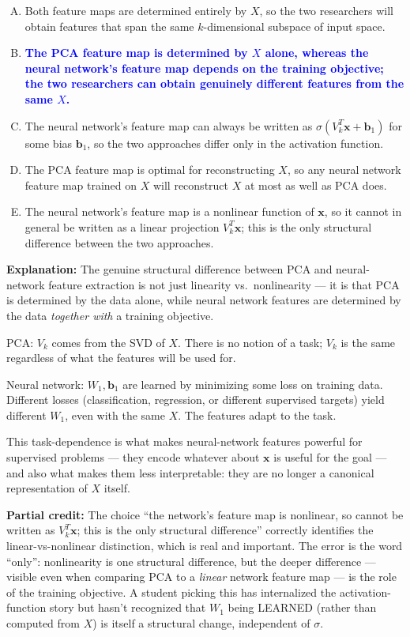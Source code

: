 \documentclass[12pt]{amsart}
\begin{document}
\begin{enumerate}[(A)]
\item Both feature maps are determined entirely by $X$, so the two researchers
will obtain features that span the same $k$-dimensional subspace of input space.
\item \textcolor{blue}{\textbf{The PCA feature map is determined by $X$ alone, whereas the neural network's feature map depends on the training objective; the two researchers can obtain genuinely different features from the same $X$.}}
\item The neural network's feature map can always be written as
$\sigma(V_k^T \mathbf{x} + \mathbf{b}_1)$ for some bias $\mathbf{b}_1$, so the
two approaches differ only in the activation function.
\item The PCA feature map is optimal for reconstructing $X$, so any neural
network feature map trained on $X$ will reconstruct $X$ at most as well as
PCA does.
\item The neural network's feature map is a nonlinear function of $\mathbf{x}$,
so it cannot in general be written as a linear projection $V_k^T \mathbf{x}$;
this is the only structural difference between the two approaches.
\end{enumerate}

\textbf{Explanation:}
The genuine structural difference between PCA and neural-network feature
extraction is not just linearity vs.\ nonlinearity --- it is that PCA is
determined by the data alone, while neural network features are determined
by the data \emph{together with} a training objective.

PCA: $V_k$ comes from the SVD of $X$. There is no notion of a task; $V_k$ is
the same regardless of what the features will be used for.

Neural network: $W_1, \mathbf{b}_1$ are learned by minimizing some loss on
training data. Different losses (classification, regression, or different
supervised targets) yield different $W_1$, even with the same $X$.
The features adapt to the task.

This task-dependence is what makes neural-network features powerful for
supervised problems --- they encode whatever about $\mathbf{x}$ is useful for
the goal --- and also what makes them less interpretable: they are no longer
a canonical representation of $X$ itself.

\textbf{Partial credit:}
The choice ``the network's feature map is nonlinear, so cannot be written as
$V_k^T\mathbf{x}$; this is the only structural difference'' correctly
identifies the linear-vs-nonlinear distinction, which is real and important.
The error is the word ``only'': nonlinearity is one structural difference,
but the deeper difference --- visible even when comparing PCA to a
\emph{linear} network feature map --- is the role of the training objective.
A student picking this has internalized the activation-function story but
hasn't recognized that $W_1$ being LEARNED (rather than computed from $X$)
is itself a structural change, independent of $\sigma$.
\end{document}
